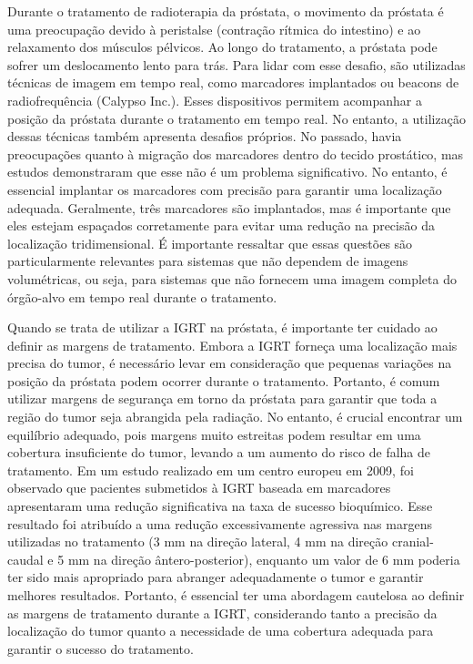 \documentclass[11pt,a4paper]{article}
\begin{document}
	Durante o tratamento de radioterapia da próstata, o movimento da próstata é uma preocupação devido à peristalse (contração rítmica do intestino) e ao relaxamento dos músculos pélvicos. Ao longo do tratamento, a próstata pode sofrer um deslocamento lento para trás. Para lidar com esse desafio, são utilizadas técnicas de imagem em tempo real, como marcadores implantados ou beacons de radiofrequência (Calypso Inc.). Esses dispositivos permitem acompanhar a posição da próstata durante o tratamento em tempo real. No entanto, a utilização dessas técnicas também apresenta desafios próprios. No passado, havia preocupações quanto à migração dos marcadores dentro do tecido prostático, mas estudos demonstraram que esse não é um problema significativo. No entanto, é essencial implantar os marcadores com precisão para garantir uma localização adequada. Geralmente, três marcadores são implantados, mas é importante que eles estejam espaçados corretamente para evitar uma redução na precisão da localização tridimensional. É importante ressaltar que essas questões são particularmente relevantes para sistemas que não dependem de imagens volumétricas, ou seja, para sistemas que não fornecem uma imagem completa do órgão-alvo em tempo real durante o tratamento.

	Quando se trata de utilizar a IGRT na próstata, é importante ter cuidado ao definir as margens de tratamento. Embora a IGRT forneça uma localização mais precisa do tumor, é necessário levar em consideração que pequenas variações na posição da próstata podem ocorrer durante o tratamento. Portanto, é comum utilizar margens de segurança em torno da próstata para garantir que toda a região do tumor seja abrangida pela radiação. No entanto, é crucial encontrar um equilíbrio adequado, pois margens muito estreitas podem resultar em uma cobertura insuficiente do tumor, levando a um aumento do risco de falha de tratamento. Em um estudo realizado em um centro europeu em 2009, foi observado que pacientes submetidos à IGRT baseada em marcadores apresentaram uma redução significativa na taxa de sucesso bioquímico. Esse resultado foi atribuído a uma redução excessivamente agressiva nas margens utilizadas no tratamento (3 mm na direção lateral, 4 mm na direção cranial-caudal e 5 mm na direção ântero-posterior), enquanto um valor de 6 mm poderia ter sido mais apropriado para abranger adequadamente o tumor e garantir melhores resultados. Portanto, é essencial ter uma abordagem cautelosa ao definir as margens de tratamento durante a IGRT, considerando tanto a precisão da localização do tumor quanto a necessidade de uma cobertura adequada para garantir o sucesso do tratamento.
\end{document}
